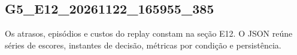 \subsection{G5\_E12\_20261122\_165955\_385}
Os atrasos, episódios e custos do replay constam na seção E12. O JSON reúne séries de escores, instantes de decisão, métricas por condição e persistência.
